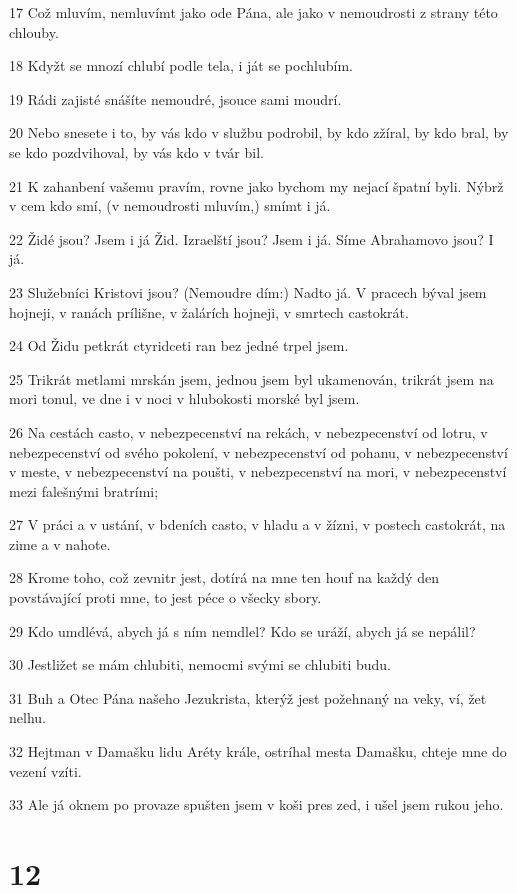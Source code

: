 \par 17 Což mluvím, nemluvímt jako ode Pána, ale jako v nemoudrosti z strany této chlouby.
\par 18 Kdyžt se mnozí chlubí podle tela, i ját se pochlubím.
\par 19 Rádi zajisté snášíte nemoudré, jsouce sami moudrí.
\par 20 Nebo snesete i to, by vás kdo v službu podrobil, by kdo zžíral, by kdo bral, by se kdo pozdvihoval, by vás kdo v tvár bil.
\par 21 K zahanbení vašemu pravím, rovne jako bychom my nejací špatní byli. Nýbrž v cem kdo smí, (v nemoudrosti mluvím,) smímt i já.
\par 22 Židé jsou? Jsem i já Žid. Izraelští jsou? Jsem i já. Síme Abrahamovo jsou? I já.
\par 23 Služebníci Kristovi jsou? (Nemoudre dím:) Nadto já. V pracech býval jsem hojneji, v ranách prílišne, v žalárích hojneji, v smrtech castokrát.
\par 24 Od Židu petkrát ctyridceti ran bez jedné trpel jsem.
\par 25 Trikrát metlami mrskán jsem, jednou jsem byl ukamenován, trikrát jsem na mori tonul, ve dne i v noci v hlubokosti morské byl jsem.
\par 26 Na cestách casto, v nebezpecenství na rekách, v nebezpecenství od lotru, v nebezpecenství od svého pokolení, v nebezpecenství od pohanu, v nebezpecenství v meste, v nebezpecenství na poušti, v nebezpecenství na mori, v nebezpecenství mezi falešnými bratrími;
\par 27 V práci a v ustání, v bdeních casto, v hladu a v žízni, v postech castokrát, na zime a v nahote.
\par 28 Krome toho, což zevnitr jest, dotírá na mne ten houf na každý den povstávající proti mne, to jest péce o všecky sbory.
\par 29 Kdo umdlévá, abych já s ním nemdlel? Kdo se uráží, abych já se nepálil?
\par 30 Jestližet se mám chlubiti, nemocmi svými se chlubiti budu.
\par 31 Buh a Otec Pána našeho Jezukrista, kterýž jest požehnaný na veky, ví, žet nelhu.
\par 32 Hejtman v Damašku lidu Aréty krále, ostríhal mesta Damašku, chteje mne do vezení vzíti.
\par 33 Ale já oknem po provaze spušten jsem v koši pres zed, i ušel jsem rukou jeho.

\chapter{12}

